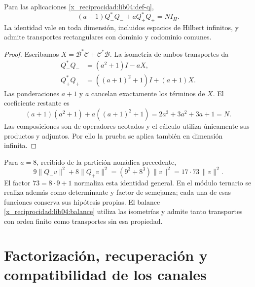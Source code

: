 \begin{theorem}
\label{x_reciprocidad:lib04:teo-balance}
Para las aplicaciones \eqref{x_reciprocidad:lib04:def-q},
\begin{equation}
 (a+1)Q_-^*Q_-+aQ_+^*Q_+=NI_H.
 \label{x_reciprocidad:lib04:balance}
\end{equation}
La identidad vale en toda dimensión, incluidos espacios de Hilbert
infinitos, y admite transportes rectangulares con dominio y codominio
comunes.
\end{theorem}

\begin{proof}
Escribamos \(X=\mathcal B^*\mathcal C+\mathcal C^*\mathcal B\).
La isometría de ambos transportes da
\begin{align*}
 Q_-^*Q_-&=(a^2+1)I-aX,\\
 Q_+^*Q_+&=((a+1)^2+1)I+(a+1)X.
\end{align*}
Las ponderaciones \(a+1\) y \(a\) cancelan exactamente los términos
de \(X\). El coeficiente restante es
\[
 (a+1)(a^2+1)+a((a+1)^2+1)
 =2a^3+3a^2+3a+1=N.
\]
Las composiciones son de operadores acotados y el cálculo utiliza
únicamente sus productos y adjuntos. Por ello la prueba se aplica
también en dimensión infinita.
\end{proof}

Para \(a=8\), recibido de la partición nonádica precedente,
\begin{equation}
 9\|Q_-v\|^2+8\|Q_+v\|^2
 =(9^3+8^3)\|v\|^2=17\cdot73\,\|v\|^2.
 \label{x_reciprocidad:lib04:balance-canonico}
\end{equation}
El factor \(73=8\cdot9+1\) normaliza esta identidad general. En el
módulo ternario se realiza además como determinante y factor de
semejanza; cada una de esas funciones conserva sus hipótesis propias.
El balance \eqref{x_reciprocidad:lib04:balance} utiliza las isometrías y admite tanto
transportes con orden finito como transportes sin esa propiedad.

\section{Factorización, recuperación y compatibilidad de los canales}
\label{x_reciprocidad:lib04:factorizacion}

